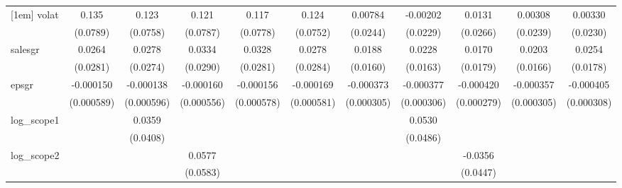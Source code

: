 \begin{table}[htbp]
\begin{tabular}{l*{10}{c}}
[1em]
volat               &       0.135\sym{*}  &       0.123         &       0.121         &       0.117         &       0.124         &     0.00784         &    -0.00202         &      0.0131         &     0.00308         &     0.00330         \\
                    &    (0.0789)         &    (0.0758)         &    (0.0787)         &    (0.0778)         &    (0.0752)         &    (0.0244)         &    (0.0229)         &    (0.0266)         &    (0.0239)         &    (0.0230)         \\
[1em]
salesgr             &      0.0264         &      0.0278         &      0.0334         &      0.0328         &      0.0278         &      0.0188         &      0.0228         &      0.0170         &      0.0203         &      0.0254         \\
                    &    (0.0281)         &    (0.0274)         &    (0.0290)         &    (0.0281)         &    (0.0284)         &    (0.0160)         &    (0.0163)         &    (0.0179)         &    (0.0166)         &    (0.0178)         \\
[1em]
epsgr               &   -0.000150         &   -0.000138         &   -0.000160         &   -0.000156         &   -0.000169         &   -0.000373         &   -0.000377         &   -0.000420         &   -0.000357         &   -0.000405         \\
                    &  (0.000589)         &  (0.000596)         &  (0.000556)         &  (0.000578)         &  (0.000581)         &  (0.000305)         &  (0.000306)         &  (0.000279)         &  (0.000305)         &  (0.000308)         \\
[1em]
log\_scope1          &                     &      0.0359         &                     &                     &                     &                     &      0.0530         &                     &                     &                     \\
                    &                     &    (0.0408)         &                     &                     &                     &                     &    (0.0486)         &                     &                     &                     \\
[1em]
log\_scope2          &                     &                     &      0.0577         &                     &                     &                     &                     &     -0.0356         &                     &                     \\
                    &                     &                     &    (0.0583)         &                     &                     &                     &                     &    (0.0447)         &                     &                     \\

\end{tabular}
\end{table}
